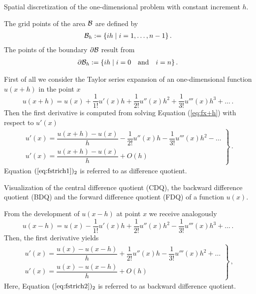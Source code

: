 \begin{Figure}[htb]
\begin{center}

\caption{Spatial discretization of the one-dimensional 
problem with constant increment $h$.}
\end{center}
\label{fig300}
\end{Figure}
%
The grid points of the area $\cal B$ are defined by
%
\begin{eqnarray}
{\cal B}_h := \{ ih \mid i = 1, \dots, n -1\} \,.
\end{eqnarray}
%
The points of the boundary $\partial \cal B$ result from
%
\begin{eqnarray}
\partial {\cal B}_h := \{ ih \mid i = 0 \quad \mbox{and} \quad i=n \} \, .
\end{eqnarray}



First of all we consider the Taylor series expansion of an 
one-dimensional function $u(x+h)$ in the point $x$
%
\begin{equation}
 u(x+h) = u(x) + \frac{1}{1!} u'(x) h 
 + \frac{1}{2!} u''(x) h^2 
 +\frac{1}{3!} u'''(x) h^3 + \dots \, . 
\label{eq:fx+h}
\end{equation}
%
Then the first derivative is computed from solving 
Equation (\ref{eq:fx+h}) with respect to $u'(x)$ 
%
\begin{eqnarray}
\left. 
\begin{array}{l}
u'(x) = \dfrac{u(x+h)-u(x)}{h} 
- \dfrac{1}{2!} u''(x) h - \dfrac{1}{3!} u'''(x) h^2 - \dots \\ [1.1ex]
u'(x) = \dfrac{u(x+h)-u(x)}{h} + O(h)
\end{array} 
\right\} \, .
\label{eq:fstrich1}
\end{eqnarray}
%
Equation $(\ref{eq:fstrich1})_2$ is referred to as
difference quotient. 

\begin{Figure}[htb]
\begin{center}

\caption{Visualization of the central difference quotient
(CDQ), the backward difference quotient (BDQ) and the
forward difference quotient (FDQ) of a function $u(x)$.}
\label{fig306}
\end{center}
\end{Figure}%

From the development of $u(x-h)$ at point $x$ we receive
analogously 
%
\begin{equation}
u(x-h) = u(x) - \frac{1}{1!} u'(x) h 
+ \frac{1}{2!} u''(x) h^2 
- \frac{1}{3!} u'''(x) h^3 + \dots \, .
\label{eq:fx-h}
\end{equation}
%
Then, the first derivative yields 
%
\begin{eqnarray}
\left. 
\begin{array}{l}
u'(x) = \dfrac{u(x)-u(x-h)}{h} + \dfrac{1}{2!} u''(x) h 
- \dfrac{1}{3!} u'''(x) h^2 + \dots \\ [1.1ex]
u'(x) = \dfrac{u(x)-u(x-h)}{h} + O(h) 
\end{array} 
\right\} \, ,
\label{eq:fstrich2}
\end{eqnarray}
%
Here, Equation  $(\ref{eq:fstrich2})_2$ is referred to as 
backward difference quotient. 

